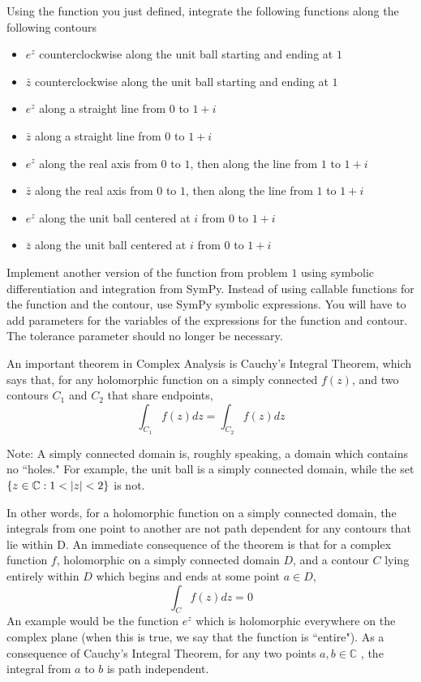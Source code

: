 \begin{problem}
Using the function you just defined, integrate the following functions along the following contours
\begin{itemize}
\item $e^z$ counterclockwise along the unit ball starting and ending at $1$
\item $\bar{z}$ counterclockwise along the unit ball starting and ending at $1$
\item $e^z$ along a straight line from $0$ to $1+i$
\item $\bar{z}$ along a straight line from $0$ to $1+i$
\item $e^z$ along the real axis from $0$ to $1$, then along the line from $1$ to $1+i$
\item $\bar{z}$ along the real axis from $0$ to $1$, then along the line from $1$ to $1+i$
\item $e^z$ along the unit ball centered at $i$ from $0$ to $1+i$
\item $\bar{z}$ along the unit ball centered at $i$ from $0$ to $1+i$
\end{itemize}
\end{problem}

\begin{problem}
Implement another version of the function from problem $1$ using symbolic differentiation and integration from SymPy.
Instead of using callable functions for the function and the contour, use SymPy symbolic expressions.
You will have to add parameters for the variables of the expressions for the function and contour.
The tolerance parameter should no longer be necessary.
\end{problem}

An important theorem in Complex Analysis is Cauchy's Integral Theorem, which says that, for any holomorphic function on a simply connected  $f(z)$, and two contours $C_1$ and $C_2$ that share endpoints, $$\int_{C_1}f(z)dz = \int_{C_2}f(z)dz$$

Note: A simply connected domain is, roughly speaking, a domain which contains no ``holes." For example, the unit ball is a simply connected domain, while the set $\lbrace z\in \mathbb{C}:1<\left\lvert z\right\rvert<2\rbrace$ is not. 

In other words, for a holomorphic function on a simply connected domain, the integrals from one point to another are not path dependent for any contours that lie within D.
An immediate consequence of the theorem is that for a complex function $f$, holomorphic on a simply connected domain $D$, and a contour $C$ lying entirely within $D$ which begins and ends at some point $a\in D$,
$$\int_C f(z)dz=0$$
An example would be the function $e^z$ which is holomorphic everywhere on the complex plane (when this is true, we say that the function is ``entire").
As a consequence of Cauchy's Integral Theorem, for any two points $a,b\in \mathbb{C}$ , the integral from $a$ to $b$ is path independent.

